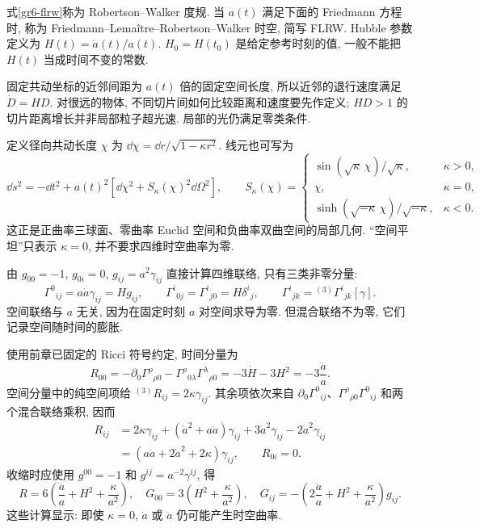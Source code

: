 \begin{definition}
式\eqref{gr6-flrw}称为 Robertson--Walker 度规. 当 $a(t)$ 满足下面的 Friedmann 方程时, 称为 Friedmann--Lema\^itre--Robertson--Walker 时空, 简写 FLRW. Hubble 参数定义为 $H(t)=\dot a(t)/a(t)$. $H_0=H(t_0)$ 是给定参考时刻的值, 一般不能把 $H(t)$ 当成时间不变的常数.
\end{definition}

固定共动坐标的近邻间距为 $a(t)$ 倍的固定空间长度, 所以近邻的退行速度满足 $\dot D=HD$. 对很远的物体, 不同切片间如何比较距离和速度要先作定义; $HD>1$ 的切片距离增长并非局部粒子超光速. 局部的光仍满足零类条件.

定义径向共动长度 $\chi$ 为 $\dd\chi=\dd r/\sqrt{1-\kappa r^2}$. 线元也可写为
\begin{equation}\label{gr6-chi-metric}
 \dd s^2=-\dd t^2+a(t)^2[\dd\chi^2+S_\kappa(\chi)^2\dd\Omega^2],
 \qquad
 S_\kappa(\chi)=\begin{cases}
 \sin(\sqrt\kappa\,\chi)/\sqrt\kappa,&\kappa>0,\\
 \chi,&\kappa=0,\\
 \sinh(\sqrt{-\kappa}\,\chi)/\sqrt{-\kappa},&\kappa<0.
 \end{cases}
\end{equation}
这正是正曲率三球面、零曲率 Euclid 空间和负曲率双曲空间的局部几何. “空间平坦”只表示 $\kappa=0$, 并不要求四维时空曲率为零.


由 $g_{00}=-1$, $g_{0i}=0$, $g_{ij}=a^2\gamma_{ij}$ 直接计算四维联络, 只有三类非零分量:
\begin{equation}\label{gr6-connection}
 \Gamma^0{}_{ij}=a\dot a\gamma_{ij}=Hg_{ij},\qquad
 \Gamma^i{}_{0j}=\Gamma^i{}_{j0}=H\delta^i{}_j,\qquad
 \Gamma^i{}_{jk}={}^{(3)}\Gamma^i{}_{jk}[\gamma].
\end{equation}
空间联络与 $a$ 无关, 因为在固定时刻 $a$ 对空间求导为零. 但混合联络不为零, 它们记录空间随时间的膨胀.

使用前章已固定的 Ricci 符号约定, 时间分量为
\[
 R_{00}=-\partial_0\Gamma^\rho{}_{\rho0}
             -\Gamma^\rho{}_{0\lambda}\Gamma^\lambda{}_{\rho0}
        =-3\dot H-3H^2=-3\frac{\ddot a}{a}.
\]
空间分量中的纯空间项给 ${}^{(3)}R_{ij}=2\kappa\gamma_{ij}$. 其余项依次来自 $\partial_0\Gamma^0{}_{ij}$、$\Gamma^\rho{}_{\rho0}\Gamma^0{}_{ij}$ 和两个混合联络乘积, 因而
\begin{align*}
 R_{ij}
 &=2\kappa\gamma_{ij}
  +(\dot a^2+a\ddot a)\gamma_{ij}
  +3\dot a^2\gamma_{ij}-2\dot a^2\gamma_{ij}\\
 &=(a\ddot a+2\dot a^2+2\kappa)\gamma_{ij},\qquad R_{0i}=0.
\end{align*}
收缩时应使用 $g^{00}=-1$ 和 $g^{ij}=a^{-2}\gamma^{ij}$, 得
\begin{equation}\label{gr6-ricci}
 R=6\left(\frac{\ddot a}{a}+H^2+\frac\kappa{a^2}\right),\quad
 G_{00}=3\left(H^2+\frac\kappa{a^2}\right),\quad
 G_{ij}=-\left(2\frac{\ddot a}{a}+H^2+\frac\kappa{a^2}\right)g_{ij}.
\end{equation}
这些计算显示: 即使 $\kappa=0$, $\dot a$ 或 $\ddot a$ 仍可能产生时空曲率.

